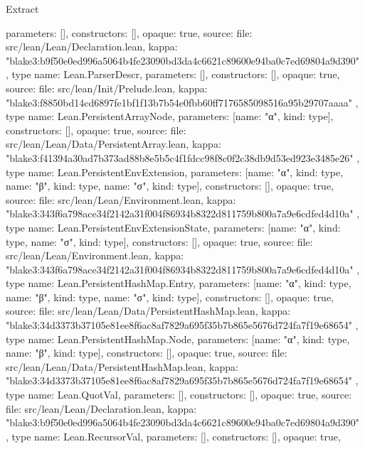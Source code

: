 \begin{lexlean}{Extract}
\begin{toolingmodule}
{{      parameters: [],
      constructors: [],
      opaque: true,
      source: {
        file: src/lean/Lean/Declaration.lean,
        kappa: "blake3:b9f50e0ed996a5064b4fe23090bd3da4c6621c89600e94ba0c7ed69804a9d390"
      }
    },
    type{
      name: Lean.ParserDescr,
      parameters: [],
      constructors: [],
      opaque: true,
      source: {
        file: src/lean/Init/Prelude.lean,
        kappa: "blake3:f8850bd14cd6897fe1bf1f13b7b54e0fbb60ff7176585098516a95b29707aaaa"
      }
    },
    type{
      name: Lean.PersistentArrayNode,
      parameters: [{name: "α", kind: type{}}],
      constructors: [],
      opaque: true,
      source: {
        file: src/lean/Lean/Data/PersistentArray.lean,
        kappa: "blake3:f41394a30ad7b373ad88b8e5b5c4f1fdcc98f8c0f2c38db9d53ed923e3485e26"
      }
    },
    type{
      name: Lean.PersistentEnvExtension,
      parameters: [{name: "α", kind: type{}}, {name: "β", kind: type{}}, {name: "σ", kind: type{}}],
      constructors: [],
      opaque: true,
      source: {
        file: src/lean/Lean/Environment.lean,
        kappa: "blake3:343f6a798ace34f2142a31f004f86934b8322d811759b800a7a9e6cdfed4d10a"
      }
    },
    type{
      name: Lean.PersistentEnvExtensionState,
      parameters: [{name: "α", kind: type{}}, {name: "σ", kind: type{}}],
      constructors: [],
      opaque: true,
      source: {
        file: src/lean/Lean/Environment.lean,
        kappa: "blake3:343f6a798ace34f2142a31f004f86934b8322d811759b800a7a9e6cdfed4d10a"
      }
    },
    type{
      name: Lean.PersistentHashMap.Entry,
      parameters: [{name: "α", kind: type{}}, {name: "β", kind: type{}}, {name: "σ", kind: type{}}],
      constructors: [],
      opaque: true,
      source: {
        file: src/lean/Lean/Data/PersistentHashMap.lean,
        kappa: "blake3:34d3373b37105e81ee8f6ac8af7829a695f35b7b865e5676d724fa7f19e68654"
      }
    },
    type{
      name: Lean.PersistentHashMap.Node,
      parameters: [{name: "α", kind: type{}}, {name: "β", kind: type{}}],
      constructors: [],
      opaque: true,
      source: {
        file: src/lean/Lean/Data/PersistentHashMap.lean,
        kappa: "blake3:34d3373b37105e81ee8f6ac8af7829a695f35b7b865e5676d724fa7f19e68654"
      }
    },
    type{
      name: Lean.QuotVal,
      parameters: [],
      constructors: [],
      opaque: true,
      source: {
        file: src/lean/Lean/Declaration.lean,
        kappa: "blake3:b9f50e0ed996a5064b4fe23090bd3da4c6621c89600e94ba0c7ed69804a9d390"
      }
    },
    type{
      name: Lean.RecursorVal,
      parameters: [],
      constructors: [],
      opaque: true,
}}
\end{toolingmodule}
\end{lexlean}
